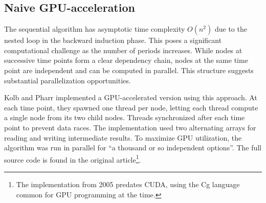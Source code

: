 \documentclass[english,12pt,a4paper,pdftex,sci,utf8]{aaltothesis}
\begin{document}
\subsection{Naive GPU-acceleration}
The sequential algorithm has asymptotic time complexity $O(n^2)$ due to the nested loop in the backward induction phase. This poses a significant computational challenge as the number of periods increases. While nodes at successive time points form a clear dependency chain, nodes at the same time point are independent and can be computed in parallel. This structure suggests substantial parallelization opportunities.

Kolb and Pharr \cite{pharr2005gpu} implemented a GPU-accelerated version using this approach. At each time point, they spawned one thread per node, letting each thread compute a single node from its two child nodes. Threads synchronized after each time point to prevent data races. The implementation used two alternating arrays for reading and writing intermediate results. To maximize GPU utilization, the algorithm was run in parallel for ``a thousand or so independent options''. The full source code is found in the original article\footnote{The implementation from 2005 predates CUDA, using the Cg language common for GPU programming at the time.}.
\end{document}
